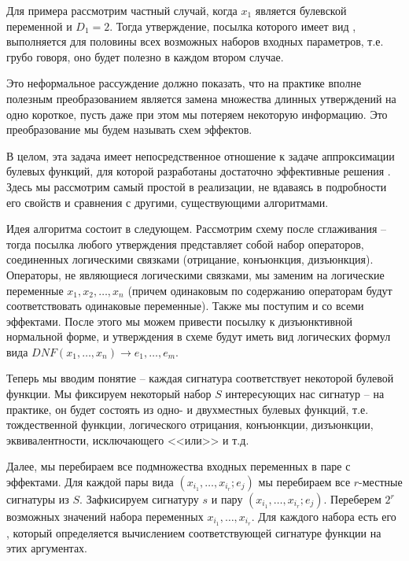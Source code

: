Для примера рассмотрим частный случай, когда $x_1$ является булевской переменной и $D_1 = 2$. Тогда утверждение, посылка которого имеет вид , выполняется для половины всех возможных наборов входных параметров, т.е. грубо говоря, оно будет полезно в каждом втором случае. 

Это неформальное рассуждение должно показать, что на практике вполне полезным преобразованием является замена множества длинных утверждений на одно короткое, пусть даже при этом мы потеряем некоторую информацию. Это преобразование мы будем называть  схем эффектов.

В целом, эта задача имеет непосредственное отношение к задаче аппроксимации булевых функций, для которой разработаны достаточно эффективные решения \cite{Blais13}. Здесь мы рассмотрим самый простой в реализации, не вдаваясь в подробности его свойств и сравнения с другими, существующими алгоритмами.

\bigskip

Идея алгоритма состоит в следующем. Рассмотрим схему после сглаживания -- тогда посылка любого утверждения представляет собой набор операторов, соединенных логическими связками (отрицание, конъюнкция, дизъюнкция). Операторы, не являющиеся логическими связками, мы заменим на логические переменные $x_1, x_2, \ldots, x_n$ (причем одинаковым по содержанию операторам будут соответствовать одинаковые переменные). Также мы поступим и со всеми эффектами. После этого мы можем привести посылку к дизъюнктивной нормальной форме, и утверждения в схеме будут иметь вид логических формул вида $DNF(x_1, \ldots, x_n) \rightarrow e_1, \ldots, e_m$.

Теперь мы вводим понятие  -- каждая сигнатура соответствует некоторой булевой функции. Мы фиксируем некоторый набор $S$ интересующих нас сигнатур -- на практике, он будет состоять из одно- и двухместных булевых функций, т.е. тождественной функции, логического отрицания, конъюнкции, дизъюнкции, эквивалентности, исключающего <<или>> и т.д. 

Далее, мы перебираем все подмножества входных переменных в паре с эффектами. Для каждой пары вида $(x_{i_1}, \ldots, x_{i_r}; e_j)$ мы перебираем все $r$-местные сигнатуры из $S$. Зафкисируем сигнатуру $s$ и пару $(x_{i_1}, \ldots, x_{i_r}; e_j)$. Переберем $2^r$ возможных значений набора переменных $x_{i_1}, \ldots, x_{i_r}$. Для каждого набора есть его , который определяется вычислением соответствующей сигнатуре функции на этих аргументах. 


